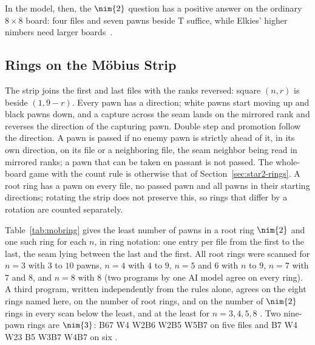 In the model, then, the $\nim{2}$ question has a positive answer on the ordinary $8\times8$ board: four files
and seven pawns beside T suffice, while Elkies' higher nimbers need larger boards~\cite{Elkies2002}.

\subsection{Rings on the M\"obius Strip}
The strip joins the first and last files with the ranks reversed: square $(n,r)$ is beside $(1,9-r)$. Every pawn
has a direction; white pawns start moving up and black pawns down, and a capture across the seam lands on the
mirrored rank and reverses the direction of the capturing pawn. Double step and promotion follow the direction.
A pawn is passed if no enemy pawn is strictly ahead of it, in its own direction, on its file or a neighboring
file, the seam neighbor being read in mirrored ranks; a pawn that can be taken en passant is not passed. The
whole-board game with the count rule is otherwise that of Section~\ref{sec:star2-rings}. A root ring has a pawn
on every file, no passed pawn and all pawns in their starting directions; rotating the strip does not preserve
this, so rings that differ by a rotation are counted separately.

Table~\ref{tab:mobring} gives the least number of pawns in a root ring $\nim{2}$ and one such ring for each $n$,
in ring notation: one entry per file from the first to the last, the seam lying between the last and the first.
All root rings were scanned for $n=3$ with $3$ to $10$ pawns, $n=4$ with $4$ to $9$, $n=5$ and $6$ with $n$ to
$9$, $n=7$ with $7$ and $8$, and $n=8$ with $8$ (two programs by one AI model agree on every ring). A third
program, written independently from the rules alone, agrees on the eight rings named here, on the number of
root rings, and on the number of $\nim{2}$ rings in every scan below the least, and at the least
for $n=3,4,5,8$ . Two nine-pawn rings are $\nim{3}$: B67 W4 W2B6 W2B5 W5B7 on five files and
B7 W4 W23 B5 W3B7 W4B7 on six .

